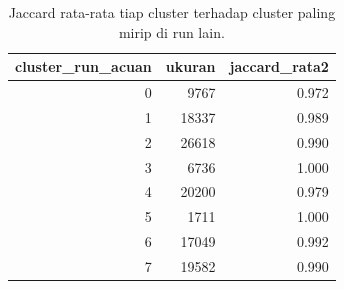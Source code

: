 \begin{table}[ht]
\centering\small
\begin{tabular}{rrr}
\toprule
cluster\_run\_acuan & ukuran & jaccard\_rata2 \\
\midrule
0 & 9767 & 0.972 \\
1 & 18337 & 0.989 \\
2 & 26618 & 0.990 \\
3 & 6736 & 1.000 \\
4 & 20200 & 0.979 \\
5 & 1711 & 1.000 \\
6 & 17049 & 0.992 \\
7 & 19582 & 0.990 \\
\bottomrule
\end{tabular}
\caption{Jaccard rata-rata tiap cluster terhadap cluster paling mirip di run lain.}
\label{tab:t3_jaccard}
\end{table}
